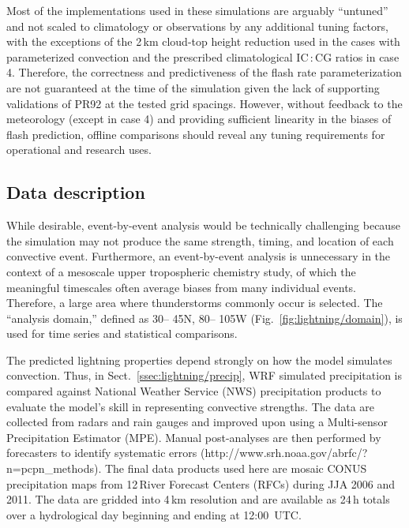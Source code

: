 Most of the implementations used in these simulations are arguably
``untuned'' and not scaled to climatology or observations by any additional
tuning factors, with the exceptions of the 2\,\unit{km} cloud-top height
reduction used in the cases with parameterized convection and the prescribed
climatological IC\,:\,CG ratios in case 4. Therefore, the correctness and
predictiveness of the flash rate parameterization are not guaranteed at the
time of the simulation given the lack of supporting validations of PR92 at
the tested grid spacings. However, without feedback to the meteorology
(except in case 4) and providing sufficient linearity in the biases of flash
prediction, offline comparisons should reveal any tuning requirements for
operational and research uses.

\subsection{Data description}\label{ssec:lightning/data}

While desirable, event-by-event analysis would be technically challenging
because the simulation may not produce the same strength, timing, and
location of each convective event. Furthermore, an event-by-event analysis is
unnecessary in the context of a mesoscale upper tropospheric chemistry study,
of which the meaningful timescales often average biases from many individual
events. Therefore, a large area where thunderstorms commonly occur is
selected. The ``analysis domain,'' defined as 30\degr -- 45\degr N,
80\degr -- 105\degr W (Fig.~\ref{fig:lightning/domain}), is used for time series
and statistical comparisons.



The predicted lightning properties depend strongly on how the model simulates
convection. Thus, in Sect.~\ref{ssec:lightning/precip}, WRF simulated precipitation
is compared against National Weather Service (NWS) precipitation products to
evaluate the model's skill in representing convective strengths. The data are
collected from radars and rain gauges and \mbox{improved} upon using a Multi-sensor
Precipitation Estimator (MPE). Manual post-analyses are then performed by
forecasters to identify systematic errors
({http://www.srh.noaa.gov/abrfc/?n=pcpn\_methods}). The final data products
used here are mosaic CONUS precipitation maps from 12\,River Forecast Centers
(RFCs) during JJA 2006 and 2011. The data are gridded into 4\,\unit{km}
resolution and are available as 24\,h totals over a hydrological day
beginning and ending at 12:00~UTC.


